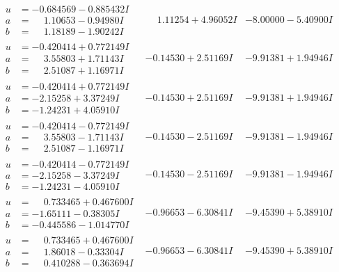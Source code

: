 \documentclass[1p]{elsarticle_modified}
\theoremstyle{definition}
\begin{document}
$$\begin{array}{c|c|c}
\begin{aligned}
u &= -0.684569 - 0.885432 I \\
a &= \phantom{-}1.10653 - 0.94980 I \\
b &= \phantom{-}1.18189 - 1.90242 I\end{aligned}
 & \phantom{-}1.11254 + 4.96052 I & -8.00000 - 5.40900 I \\ \hline\begin{aligned}
u &= -0.420414 + 0.772149 I \\
a &= \phantom{-}3.55803 + 1.71143 I \\
b &= \phantom{-}2.51087 + 1.16971 I\end{aligned}
 & -0.14530 + 2.51169 I & -9.91381 + 1.94946 I \\ \hline\begin{aligned}
u &= -0.420414 + 0.772149 I \\
a &= -2.15258 + 3.37249 I \\
b &= -1.24231 + 4.05910 I\end{aligned}
 & -0.14530 + 2.51169 I & -9.91381 + 1.94946 I \\ \hline\begin{aligned}
u &= -0.420414 - 0.772149 I \\
a &= \phantom{-}3.55803 - 1.71143 I \\
b &= \phantom{-}2.51087 - 1.16971 I\end{aligned}
 & -0.14530 - 2.51169 I & -9.91381 - 1.94946 I \\ \hline\begin{aligned}
u &= -0.420414 - 0.772149 I \\
a &= -2.15258 - 3.37249 I \\
b &= -1.24231 - 4.05910 I\end{aligned}
 & -0.14530 - 2.51169 I & -9.91381 - 1.94946 I \\ \hline\begin{aligned}
u &= \phantom{-}0.733465 + 0.467600 I \\
a &= -1.65111 - 0.38305 I \\
b &= -0.445586 - 1.014770 I\end{aligned}
 & -0.96653 - 6.30841 I & -9.45390 + 5.38910 I \\ \hline\begin{aligned}
u &= \phantom{-}0.733465 + 0.467600 I \\
a &= \phantom{-}1.86018 - 0.33304 I \\
b &= \phantom{-}0.410288 - 0.363694 I\end{aligned}
 & -0.96653 - 6.30841 I & -9.45390 + 5.38910 I \\ \hline\begin{aligned}

\end{aligned}
\end{array}$$
\end{document}
